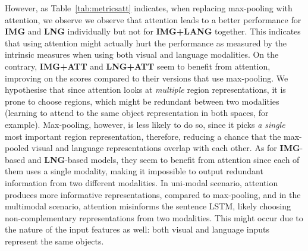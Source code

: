 \documentclass[11pt,a4paper]{article}
\begin{document}
\iffalse
However, as Table~\ref{tab:metricsatt} indicates, when replacing max-pooling with attention, %
we observe %
we observe that attention leads to a better performance for \textbf{IMG} and \textbf{LNG} individually but not for \textbf{IMG+LANG} together.
This indicates that using attention might actually hurt %
the performance as measured by the intrinsic measures when using both visual and language modalities.
On the contrary, \textbf{IMG+ATT} and \textbf{LNG+ATT} seem to benefit from attention, improving on the scores compared to their versions that use max-pooling. 
We hypothesise that since attention looks at \textit{multiple} region representations, it is prone to choose regions, which might be redundant between two modalities (learning to attend to the same object representation in both spaces, for example). %
Max-pooling, however, is less likely to do so, since it picks \textit{a single} most important region representation, therefore, reducing a chance that the max-pooled visual and language representations overlap with each other.
As for \textbf{IMG}-based and \textbf{LNG}-based models, they seem to benefit from attention since each of them uses a single modality, making it impossible to output redundant information from two different modalities.
In uni-modal scenario, attention produces more informative representations, compared to max-pooling, and in the multimodal scenario, attention misinforms the sentence LSTM, likely choosing non-complementary representations from two modalities.
This might occur due to the nature of the input features as well: both visual and language inputs represent the same objects.
\end{document}
